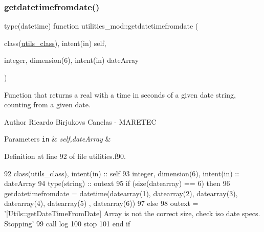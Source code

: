 \subsubsection{\texorpdfstring{getdatetimefromdate()}{getdatetimefromdate()}}
{\footnotesize\ttfamily type(datetime) function utilities\+\_\+mod\+::getdatetimefromdate (\begin{DoxyParamCaption}\item[{class(\mbox{\hyperlink{structutilities__mod_1_1utils__class}{utils\+\_\+class}}), intent(in)}]{self,  }\item[{integer, dimension(6), intent(in)}]{date\+Array }\end{DoxyParamCaption})\hspace{0.3cm}{\ttfamily [private]}}



Function that returns a real with a time in seconds of a given date string, counting from a given date. 

\begin{DoxyAuthor}{Author}
Ricardo Birjukovs Canelas -\/ M\+A\+R\+E\+T\+EC 
\end{DoxyAuthor}

\begin{DoxyParams}[1]{Parameters}
\mbox{\tt in}  & {\em self,date\+Array} & \\
\hline
\end{DoxyParams}


Definition at line 92 of file utilities.\+f90.


\begin{DoxyCode}
92     \textcolor{keywordtype}{class}(utils\_class), \textcolor{keywordtype}{intent(in)} :: self
93     \textcolor{keywordtype}{integer}, \textcolor{keywordtype}{dimension(6)}, \textcolor{keywordtype}{intent(in)} :: dateArray
94     \textcolor{keywordtype}{type}(string) :: outext
95     \textcolor{keywordflow}{if} (\textcolor{keyword}{size}(datearray) == 6) \textcolor{keywordflow}{then}
96         getdatetimefromdate = datetime(datearray(1), datearray(2), datearray(3), datearray(4), datearray(5)
      , datearray(6))
97     \textcolor{keywordflow}{else}
98         outext = \textcolor{stringliteral}{'[Utils::getDateTimeFromDate] Array is not the correct size, check iso date specs.
       Stopping'}
99         \textcolor{keyword}{call }log%
100         stop
101 \textcolor{keywordflow}{    end if}
\end{DoxyCode}
\mbox{\label{namespaceutilities__mod_a0dea0f7cb05b1a7c7c1da1d85a416b37}} 
